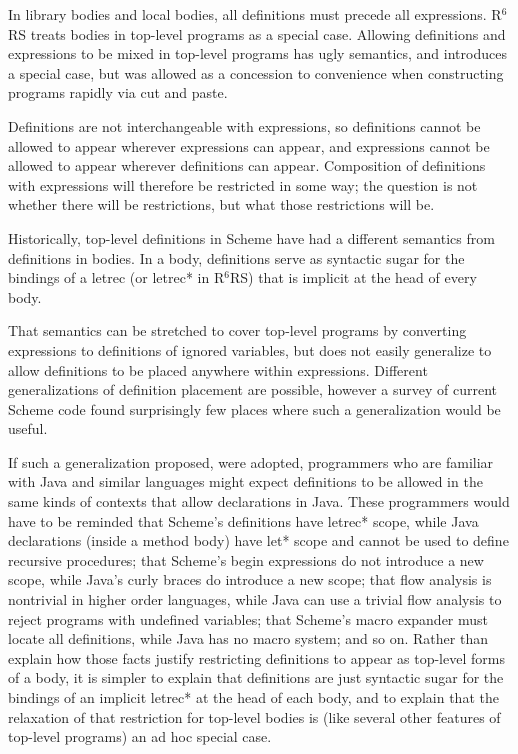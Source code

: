 \documentclass[twoside,twocolumn]{algol60}
\newcommand{\rn}[1]{R$^{#1}$RS}
\begin{document}
In library bodies and local bodies, all definitions must precede all
expressions. \rn{6} treats bodies in top-level programs as a special
case.  Allowing definitions and expressions to be mixed in top-level
programs has ugly semantics, and introduces a special case, but was
allowed as a concession to convenience when constructing programs
rapidly via cut and paste.

Definitions are not interchangeable with expressions, so definitions
cannot be allowed to appear wherever expressions can appear, and
expressions cannot be allowed to appear wherever definitions can
appear.  Composition of definitions with expressions will therefore be
restricted in some way; the question is not whether there will be
restrictions, but what those restrictions will be.

Historically, top-level definitions in Scheme have had a different
semantics from definitions in bodies.  In a body, definitions serve as
syntactic sugar for the bindings of a {\cf letrec} (or {\cf letrec*}
in \rn{6}) that is implicit at the head of every body.

That semantics can be stretched to cover top-level programs by
converting expressions to definitions of ignored variables, but does
not easily generalize to allow definitions to be placed anywhere
within expressions.  Different generalizations of definition placement
are possible, however a survey of current Scheme code found
surprisingly few places where such a generalization would be useful.

If such a generalization proposed, were adopted, programmers who are
familiar with Java and similar languages might expect definitions to
be allowed in the same kinds of contexts that allow declarations in
Java.  These programmers would have to be reminded that Scheme's
definitions have {\cf letrec*} scope, while Java declarations (inside
a method body) have {\cf let*} scope and cannot be used to define
recursive procedures; that Scheme's begin expressions do not introduce
a new scope, while Java's curly braces do introduce a new scope; that
flow analysis is nontrivial in higher order languages, while Java can
use a trivial flow analysis to reject programs with undefined
variables; that Scheme's macro expander must locate all definitions,
while Java has no macro system; and so on.  Rather than explain how
those facts justify restricting definitions to appear as top-level
forms of a body, it is simpler to explain that definitions are just
syntactic sugar for the bindings of an implicit {\cf letrec*} at the
head of each body, and to explain that the relaxation of that
restriction for top-level bodies is (like several other features of
top-level programs) an ad hoc special case.
\end{document}

